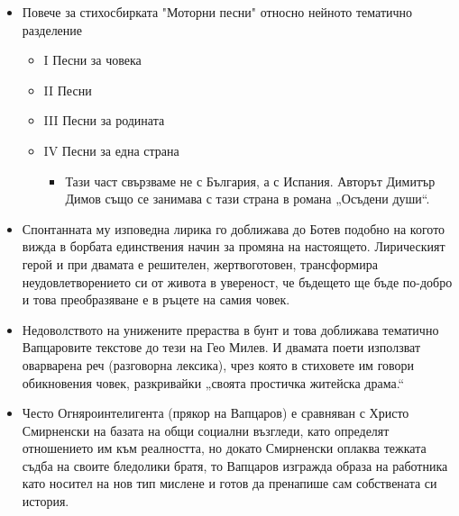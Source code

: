 \documentclass[12pt,a4paper]{article}
\begin{document}
\begin{itemize}[leftmargin=*, noitemsep, topsep=2pt, parsep=0pt]
    \item Повече за стихосбирката "Моторни песни" относно нейното тематично разделение
    \begin{itemize}[leftmargin=*]
        \item I Песни за човека 
        \item II Песни
        \item III Песни за родината
        \item IV Песни за една страна
        \begin{itemize}[leftmargin=*]
            \item Тази част свързваме не с България, а с Испания. Авторът Димитър Димов също се занимава с тази страна в романа „Осъдени души“.
        \end{itemize}
    \end{itemize}
\end{itemize}

\begin{itemize}[leftmargin=*]
\vspace{-0.45cm}
\item Спонтанната му изповедна лирика го доближава до Ботев подобно на когото вижда в борбата единствения начин за промяна на настоящето. Лирическият герой и при двамата е решителен, жертвоготовен, трансформира неудовлетворението си от живота в увереност, че бъдещето ще бъде по-добро и това преобразяване е в ръцете на самия човек.
\end{itemize}

\begin{itemize}[leftmargin=*]
\vspace{-0.45cm}
\item Недоволството на унижените прераства в бунт и това доближава тематично Вапцаровите текстове до тези на Гео Милев. И двамата поети използват оварварена реч (разговорна лексика), чрез която в стиховете им говори обикновения човек, разкривайки „своята простичка житейска драма.“
\end{itemize}

\begin{itemize}[leftmargin=*]
\vspace{-0.45cm}
\item Често Огняроинтелигента (прякор на Вапцаров) е сравняван с Христо Смирненски на базата на общи социални възгледи, като определят отношението им към реалността, но докато Смирненски оплаква тежката съдба на своите бледолики братя, то Вапцаров изгражда образа на работника като носител на нов тип мислене и готов да пренапише сам собствената си история.
\end{itemize}
\end{document}
